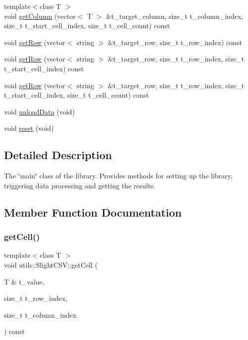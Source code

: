 \begin{DoxyCompactItemize}
\item 
{\footnotesize template$<$class T $>$ }\\void \hyperlink{classutils_1_1SlightCSV_a153cbb5059533c2103ec7ade57e4e414}{get\+Column} (vector$<$ T $>$ \&t\+\_\+target\+\_\+column, size\+\_\+t t\+\_\+column\+\_\+index, size\+\_\+t t\+\_\+start\+\_\+cell\+\_\+index, size\+\_\+t t\+\_\+cell\+\_\+count) const
\item 
void \hyperlink{classutils_1_1SlightCSV_ad4b0243488827303cd22d5efd41d96b6}{get\+Row} (vector$<$ string $>$ \&t\+\_\+target\+\_\+row, size\+\_\+t t\+\_\+row\+\_\+index) const
\item 
void \hyperlink{classutils_1_1SlightCSV_ad57a5c42bc8de6afa3d4324e52f20e2c}{get\+Row} (vector$<$ string $>$ \&t\+\_\+target\+\_\+row, size\+\_\+t t\+\_\+row\+\_\+index, size\+\_\+t t\+\_\+start\+\_\+cell\+\_\+index) const
\item 
void \hyperlink{classutils_1_1SlightCSV_a7527573dea0d6e5dc5dcfd4eab005a2b}{get\+Row} (vector$<$ string $>$ \&t\+\_\+target\+\_\+row, size\+\_\+t t\+\_\+row\+\_\+index, size\+\_\+t t\+\_\+start\+\_\+cell\+\_\+index, size\+\_\+t t\+\_\+cell\+\_\+count) const
\item 
void \hyperlink{classutils_1_1SlightCSV_aaa9c8042d6231660cb08ada7c1a8dccb}{unload\+Data} (void)
\item 
void \hyperlink{classutils_1_1SlightCSV_abc28f1e33cc67dd5d4380254070ecf97}{reset} (void)
\end{DoxyCompactItemize}


\subsection{Detailed Description}
The \char`\"{}main\char`\"{} class of the library. Provides methods for setting up the library, triggering data processing and getting the results. 

\subsection{Member Function Documentation}
\mbox{\label{classutils_1_1SlightCSV_a4408a8e8d32a579a0f5e33a1083e7fb8}} 
\subsubsection{\texorpdfstring{get\+Cell()}{getCell()}}
{\footnotesize\ttfamily template$<$class T $>$ \\
void utils\+::\+Slight\+C\+S\+V\+::get\+Cell (\begin{DoxyParamCaption}\item[{T \&}]{t\+\_\+value,  }\item[{size\+\_\+t}]{t\+\_\+row\+\_\+index,  }\item[{size\+\_\+t}]{t\+\_\+column\+\_\+index }\end{DoxyParamCaption}) const}

